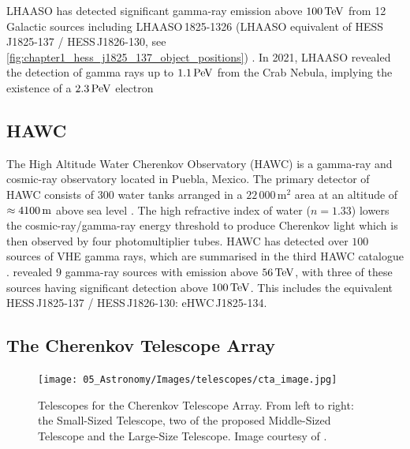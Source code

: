 \newpar
LHAASO has detected significant gamma-ray emission above $100\,\TeV$ from 12 Galactic sources including \mbox{LHAASO\,1825-1326} (LHAASO equivalent of \mbox{HESS\,J1825-137} / \mbox{HESS\,J1826-130}, see \autoref{fig:chapter1_hess_j1825_137_object_positions}) \citep{2021Natur.594...33C}. In 2021, LHAASO revealed the detection of gamma rays up to $1.1\,\PeV$ from the Crab Nebula, implying the existence of a $2.3\,\PeV$ electron \citep{doi:10.1126/science.abg5137}

\subsection{HAWC}

The High Altitude Water Cherenkov Observatory (HAWC) is a gamma-ray and cosmic-ray observatory located in Puebla, Mexico. The primary detector of HAWC consists of $300$ water tanks arranged in a $22\,000\,\si{\meter\squared}$ area at an altitude of $\approx 4100\,\si{\meter}$ above sea level \citep{2023NIMPA105268253A}. The high refractive index of water ($n=1.33$) lowers the cosmic-ray/gamma-ray energy threshold to produce Cherenkov light which is then observed by four photomultiplier tubes.
\newpar
HAWC has detected over $100$ sources of VHE gamma rays, which are summarised in the third HAWC catalogue \citep{2020ApJ...905...76A}. \cite{PhysRevLett.124.021102} revealed $9$ gamma-ray sources with emission above $56\,\TeV$, with three of these sources having significant detection above $100\,\TeV$. This includes the equivalent \mbox{HESS\,J1825-137} / \mbox{HESS\,J1826-130}: \mbox{eHWC\,J1825-134}.

\subsection{The Cherenkov Telescope Array}

\begin{figure}[ht]
    \centering
    \texttt{[image: 05\_Astronomy/Images/telescopes/cta\_image.jpg]}
    \caption{Telescopes for the Cherenkov Telescope Array. From left to right: the Small-Sized Telescope, two of the proposed Middle-Sized Telescope and the Large-Size Telescope. Image courtesy of \cite{cherenkov_telescope_array}.}
    \label{fig:chapter_2_cta}
\end{figure}

